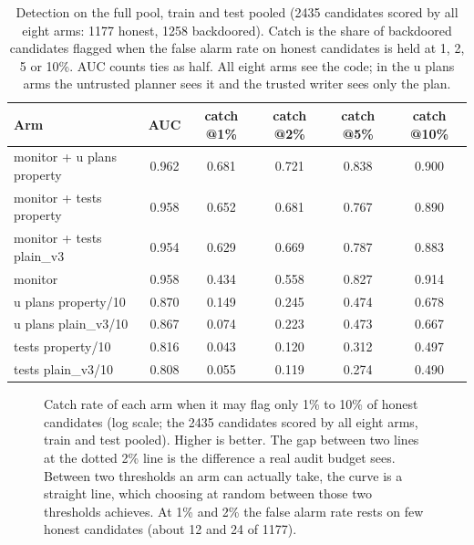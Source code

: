 \begin{table}[t]
\centering
\small
\begin{tabular}{lccccc}
\hline
Arm & AUC & catch @1\% & catch @2\% & catch @5\% & catch @10\% \\
\hline
monitor + u plans property & 0.962 & 0.681 & 0.721 & 0.838 & 0.900 \\
monitor + tests property   & 0.958 & 0.652 & 0.681 & 0.767 & 0.890 \\
monitor + tests plain\_v3  & 0.954 & 0.629 & 0.669 & 0.787 & 0.883 \\
monitor                    & 0.958 & 0.434 & 0.558 & 0.827 & 0.914 \\
u plans property/10        & 0.870 & 0.149 & 0.245 & 0.474 & 0.678 \\
u plans plain\_v3/10       & 0.867 & 0.074 & 0.223 & 0.473 & 0.667 \\
tests property/10          & 0.816 & 0.043 & 0.120 & 0.312 & 0.497 \\
tests plain\_v3/10         & 0.808 & 0.055 & 0.119 & 0.274 & 0.490 \\
\hline
\end{tabular}
\caption{Detection on the full pool, train and test pooled (2435 candidates
scored by all eight arms: 1177 honest, 1258 backdoored). Catch is the share of
backdoored candidates flagged when the false alarm rate on honest candidates is
held at 1, 2, 5 or 10\%. AUC counts ties as half. All eight arms see the code;
in the u plans arms the untrusted planner sees it and the trusted writer sees
only the plan.}
\label{tab:detection}
\end{table}

\begin{figure}[t]
\centering
\caption{Catch rate of each arm when it may flag only 1\% to 10\% of honest
candidates (log scale; the 2435 candidates scored by all eight arms, train and
test pooled). Higher is better. The gap between two lines at the dotted 2\%
line is the difference a real audit budget sees. Between two thresholds an arm
can actually take, the curve is a straight line, which choosing at random
between those two thresholds achieves. At 1\% and 2\% the false alarm rate rests
on few honest candidates (about 12 and 24 of 1177).}
\label{fig:catch-at-fpr}
\end{figure}

